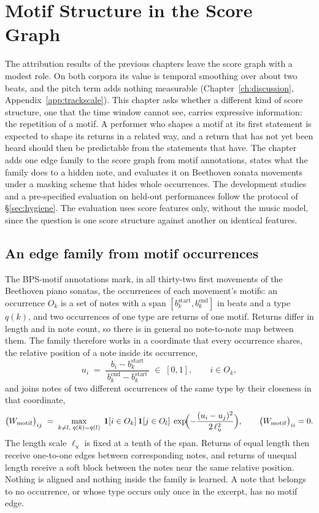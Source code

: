 \chapter{Motif Structure in the Score Graph}\label{ch:motif}
The attribution results of the previous chapters leave the score graph with
a modest role. On both corpora its value is temporal smoothing over about
two beats, and the pitch term adds nothing measurable
(Chapter~\ref{ch:discussion}, Appendix~\ref{app:trackscale}). This chapter
asks whether a different kind of score structure, one that the time window
cannot see, carries expressive information: the repetition of a motif. A
performer who shapes a motif at its first statement is expected to shape
its returns in a related way, and a return that has not yet been heard
should then be predictable from the statements that have. The chapter adds
one edge family to the score graph from motif annotations, states what the
family does to a hidden note, and evaluates it on Beethoven sonata
movements under a masking scheme that hides whole occurrences. The
development studies and a pre-specified evaluation on held-out performances
follow the protocol of \S\ref{sec:hygiene}. The evaluation uses score
features only, without the music model, since the question is one score
structure against another on identical features.

\section{An edge family from motif occurrences}\label{sec:motif-family}
The BPS-motif annotations \cite{hsiao2023bpsmotif} mark, in all thirty-two
first movements of the Beethoven piano sonatas, the occurrences of each
movement's motifs: an occurrence $O_k$ is a set of notes with a span
$[b_k^{\mathrm{start}}, b_k^{\mathrm{end}}]$ in beats and a type $q(k)$, and
two occurrences of one type are returns of one motif. Returns differ in
length and in note count, so there is in general no note-to-note map
between them. The family therefore works in a coordinate that every
occurrence shares, the relative position of a note inside its occurrence,
\begin{equation}
  u_i \;=\; \frac{b_i - b_k^{\mathrm{start}}}{\,b_k^{\mathrm{end}} - b_k^{\mathrm{start}}\,}
  \;\in\; [0, 1], \qquad i \in O_k,
  \label{eq:motif-u}
\end{equation}
and joins notes of two different occurrences of the same type by their
closeness in that coordinate,
\begin{equation}
  \bigl(W_{\mathrm{motif}}\bigr)_{ij} \;=\;
  \max_{k \neq l,\; q(k) = q(l)}\;
  \mathbf 1[i \in O_k]\, \mathbf 1[j \in O_l]\;
  \exp\!\Bigl(-\frac{(u_i - u_j)^2}{2\,\ell_u^2}\Bigr),
  \qquad \bigl(W_{\mathrm{motif}}\bigr)_{ii} = 0 .
  \label{eq:motif-adj}
\end{equation}
The length scale $\ell_u$ is fixed at a tenth of the span. Returns of equal
length then receive one-to-one edges between corresponding notes, and
returns of unequal length receive a soft block between the notes near the
same relative position. Nothing is aligned and nothing inside the family is
learned. A note that belongs to no occurrence, or whose type occurs only
once in the excerpt, has no motif edge.

